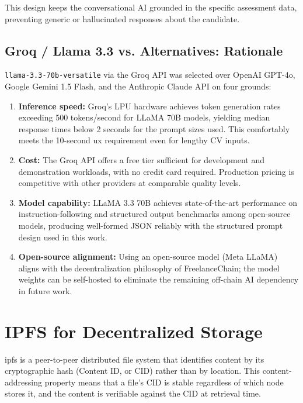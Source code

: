 This design keeps the conversational AI grounded in the specific assessment data, preventing generic or hallucinated responses about the candidate.

\subsection{Groq / Llama 3.3 vs. Alternatives: Rationale}

\texttt{llama-3.3-70b-versatile} via the Groq API was selected over OpenAI GPT-4o, Google Gemini 1.5 Flash, and the Anthropic Claude API on four grounds:

\begin{enumerate}
    \item \textbf{Inference speed:} Groq's LPU hardware achieves token generation rates exceeding 500 tokens/second for LLaMA 70B models, yielding median response times below 2 seconds for the prompt sizes used. This comfortably meets the 10-second \gls{ux} requirement even for lengthy CV inputs.
    \item \textbf{Cost:} The Groq API offers a free tier sufficient for development and demonstration workloads, with no credit card required. Production pricing is competitive with other providers at comparable quality levels.
    \item \textbf{Model capability:} LLaMA 3.3 70B achieves state-of-the-art performance on instruction-following and structured output benchmarks among open-source models, producing well-formed JSON reliably with the structured prompt design used in this work.
    \item \textbf{Open-source alignment:} Using an open-source model (Meta LLaMA) aligns with the decentralization philosophy of FreelanceChain; the model weights can be self-hosted to eliminate the remaining off-chain AI dependency in future work.
\end{enumerate}

\section{IPFS for Decentralized Storage}
\label{section:3.7}

\gls{ipfs} \cite{ipfs2015} is a peer-to-peer distributed file system that identifies content by its cryptographic hash (Content ID, or CID) rather than by location. This content-addressing property means that a file's CID is stable regardless of which node stores it, and the content is verifiable against the CID at retrieval time.

